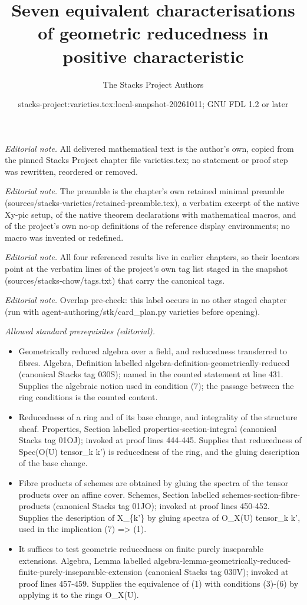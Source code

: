 \documentclass[10pt,a4paper]{amsart}
\title{Seven equivalent characterisations of geometric reducedness in positive characteristic}
\author{The Stacks Project Authors}
\date{stacks-project:varieties.tex:local-snapshot-20261011; GNU FDL 1.2 or later}
\theoremstyle{plain}
\theoremstyle{definition}
\theoremstyle{remark}
\numberwithin{equation}{subsection}
\begin{document}
\maketitle
\noindent\textit{Editorial note.} All delivered mathematical text is the author's own, copied from the pinned Stacks Project chapter file varieties.tex; no statement or proof step was rewritten, reordered or removed.\par\medskip
\noindent\textit{Editorial note.} The preamble is the chapter's own retained minimal preamble (sources/stacks-varieties/retained-preamble.tex), a verbatim excerpt of the native Xy-pic setup, of the native theorem declarations with mathematical macros, and of the project's own no-op definitions of the reference display environments; no macro was invented or redefined.\par\medskip
\noindent\textit{Editorial note.} All four referenced results live in earlier chapters, so their locators point at the verbatim lines of the project's own tag list staged in the snapshot (sources/stacks-chow/tags.txt) that carry the canonical tags.\par\medskip
\noindent\textit{Editorial note.} Overlap pre-check: this label occurs in no other staged chapter (run with agent-authoring/stk/card\_plan.py varieties before opening).\par\medskip
\noindent\textit{Allowed standard prerequisites (editorial).}\begin{itemize}
\item Geometrically reduced algebra over a field, and reducedness transferred to fibres. Algebra, Definition labelled algebra-definition-geometrically-reduced (canonical Stacks tag 030S); named in the counted statement at line 431. Supplies the algebraic notion used in condition (7); the passage between the ring conditions is the counted content.
\item Reducedness of a ring and of its base change, and integrality of the structure sheaf. Properties, Section labelled properties-section-integral (canonical Stacks tag 01OJ); invoked at proof lines 444-445. Supplies that reducedness of Spec(O(U) tensor\_k k') is reducedness of the ring, and the gluing description of the base change.
\item Fibre products of schemes are obtained by gluing the spectra of the tensor products over an affine cover. Schemes, Section labelled schemes-section-fibre-products (canonical Stacks tag 01JO); invoked at proof lines 450-452. Supplies the description of X\_\{k'\} by gluing spectra of O\_X(U) tensor\_k k', used in the implication (7) => (1).
\item It suffices to test geometric reducedness on finite purely inseparable extensions. Algebra, Lemma labelled algebra-lemma-geometrically-reduced-finite-purely-inseparable-extension (canonical Stacks tag 030V); invoked at proof lines 457-459. Supplies the equivalence of (1) with conditions (3)-(6) by applying it to the rings O\_X(U).
\end{itemize}\medskip
\end{document}
